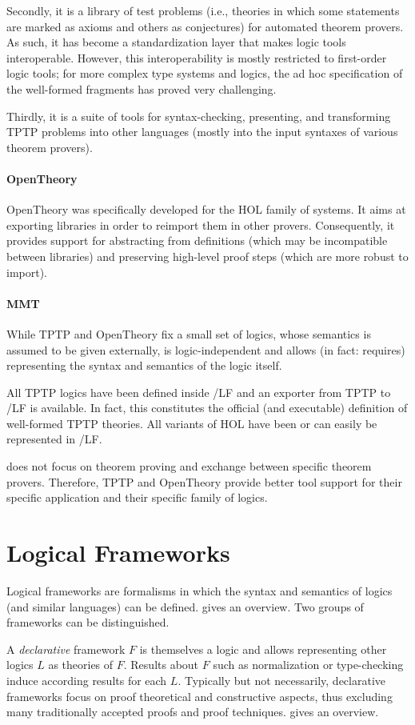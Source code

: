 \documentclass[12pt]{article}
\newcommand{\system}[2][]{\paragraph{#2}#2 \ifnonempty[\cite{#2}]{#1}{\cite{#1}}}
\begin{document}
Secondly, it is a library of test problems (i.e., theories in which some statements are marked as axioms and others as conjectures) for automated theorem provers.
As such, it has become a standardization layer that makes logic tools interoperable.
However, this interoperability is mostly restricted to first-order logic tools; for more complex type systems and logics, the ad hoc specification of the well-formed fragments has proved very challenging.

Thirdly, it is a suite of tools for syntax-checking, presenting, and transforming TPTP problems into other languages (mostly into the input syntaxes of various theorem provers).

\system{OpenTheory} was specifically developed for the HOL family of systems.
It aims at exporting libraries in order to reimport them in other provers.
Consequently, it provides support for abstracting from definitions (which may be incompatible between libraries) and preserving high-level proof steps (which are more robust to import).

\paragraph{MMT}
While TPTP and OpenTheory fix a small set of logics, whose semantics is assumed to be given externally, \mmt is logic-independent and allows (in fact: requires) representing the syntax and semantics of the logic itself.

All TPTP logics have been defined inside \mmt/LF and an exporter from TPTP to \mmt/LF is available.
In fact, this constitutes the official (and executable) definition of well-formed TPTP theories.
All variants of HOL have been or can easily be represented in \mmt/LF.

\mmt does not focus on theorem proving and exchange between specific theorem provers.
Therefore, TPTP and OpenTheory provide better tool support for their specific application and their specific family of logics.

\section{Logical Frameworks}

Logical frameworks are formalisms in which the syntax and semantics of logics (and similar languages) can be defined.
\cite{rabe:howto:14} gives an overview.
Two groups of frameworks can be distinguished.

A \emph{declarative} framework $F$ is themselves a logic and allows representing other logics $L$ as theories of $F$.
Results about $F$ such as normalization or type-checking induce according results for each $L$.
Typically but not necessarily, declarative frameworks focus on proof theoretical and constructive aspects, thus excluding many traditionally accepted proofs and proof techniques.
\cite{logicalframeworks} gives an overview.
\end{document}
